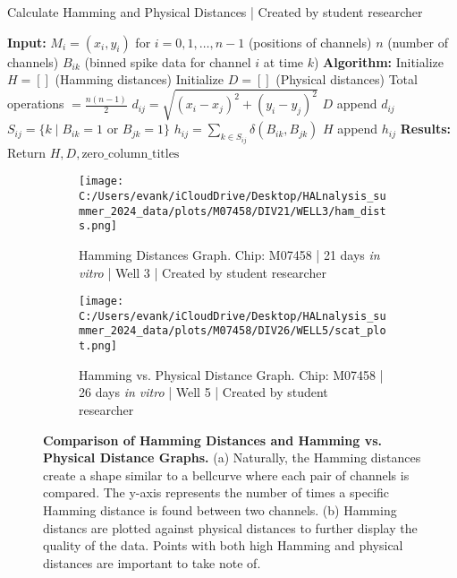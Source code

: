 \documentclass{article} %
\begin{document}
\begin{singlespace}
    \begin{algorithm}
    \caption{Calculate Hamming and Physical Distances | Created by student researcher}
        \begin{algorithmic}[1]
            \State \textbf{Input:}
            \State  $M_i = (x_i, y_i)$ for $i = 0, 1, \ldots, n-1$ (positions of channels)
            \State  $n$ (number of channels)
            \State  $B_{ik}$ (binned spike data for channel $i$ at time $k$)
            \State
            \State \textbf{Algorithm:}
            \State  Initialize $H = []$ (Hamming distances)
            \State  Initialize $D = []$ (Physical distances)
            \State  Total operations $= \frac{n(n-1)}{2}$
                    \State $d_{ij} = \sqrt{(x_i - x_j)^2 + (y_i - y_j)^2}$
                    \State $D$ append $d_{ij}$
                    \State $S_{ij} = \{k \mid B_{ik} = 1 \text{ or } B_{jk} = 1\}$
                    \State $h_{ij} = \sum_{k \in S_{ij}} \delta(B_{ik}, B_{jk})$
                    \State $H$ append $h_{ij}$
                \EndFor
            \EndFor
            \State
            \State \textbf{Results:}
            \State  Return $H, D, \text{zero\_column\_titles}$
        \end{algorithmic}
    \end{algorithm}
\end{singlespace}


\begin{figure}
    \centering
    \begin{subfigure}[b]{0.49\textwidth}
        \centering
        \texttt{[image: C:/Users/evank/iCloudDrive/Desktop/HALnalysis\_summer\_2024\_data/plots/M07458/DIV21/WELL3/ham\_dists.png]}
        \caption{Hamming Distances Graph. Chip: M07458 | 21 days \textit{in vitro} | Well 3 | Created by student researcher}
    \end{subfigure}
    \hspace{\fill}
    \begin{subfigure}[b]{0.49\textwidth}
        \centering
        \texttt{[image: C:/Users/evank/iCloudDrive/Desktop/HALnalysis\_summer\_2024\_data/plots/M07458/DIV26/WELL5/scat\_plot.png]}
        \caption{Hamming vs. Physical Distance Graph. Chip: M07458 | 26 days \textit{in vitro} | Well 5 | Created by student researcher}
    \end{subfigure}
    \caption{\textbf{Comparison of Hamming Distances and Hamming vs. Physical Distance Graphs.} (a) Naturally, the Hamming distances create a shape similar to a bellcurve where each pair of channels is compared. The y-axis represents the number of times a specific Hamming distance is found between two channels. (b) Hamming distancs are plotted against physical distances to further display the quality of the data. Points with both high Hamming and physical distances are important to take note of.}
\end{figure}
\end{document}

